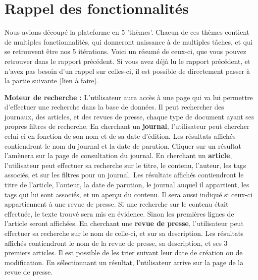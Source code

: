 \section{Rappel des fonctionnalités}

	Nous avions découpé la plateforme en 5 'thèmes'. Chacun de ces thèmes contient de multiples fonctionnalités, qui donneront naissance à de multiples tâches, et qui se retrouvent être nos 5 itérations. Voici un résumé de ceux-ci, que vous pouvez retrouver dans le rapport précédent. Si vous avez déjà lu le rapport précédent, et n'avez pas besoin d'un rappel sur celles-ci, il est possible de directement passer à la partie suivante (lien à faire).

	\textbf{Moteur de recherche :} L'utilisateur aura accès à une page qui va lui permettre d'effectuer une recherche dans la base de données. Il peut rechercher des journaux, des articles, et des revues de presse, chaque type de document ayant ses propres filtres de recherche. En cherchant un \textbf{journal}, l'utilisateur peut chercher celui-ci en fonction de son nom et de sa date d'édition. Les résultats affichés contiendront le nom du journal et la date de parution. Cliquer sur un résultat l'amènera sur la page de consultation du journal. En cherchant un \textbf{article}, l'utilisateur peut effectuer sa recherche sur le titre, le contenu, l'auteur, les tags associés, et sur les filtres pour un journal. Les résultats affichés contiendront le titre de l'article, l'auteur, la date de parution, le journal auquel il appartient, les tags qui lui sont associés, et un aperçu du contenu. Il sera aussi indiqué si ceux-ci appartiennent à une revue de presse. Si une recherche sur le contenu était effectuée, le texte trouvé sera mis en évidence. Sinon les premières lignes de l'article seront affichées. En cherchant une \textbf{revue de presse}, l'utilisateur peut effectuer sa recherche sur le nom de celle-ci, et sur sa description. Les résultats affichés contiendront le nom de la revue de presse, sa description, et ses 3 premiers articles. Il est possible de les trier suivant leur date de création ou de modification. En sélectionnant un résultat, l'utilisateur arrive sur la page de la revue de presse. 

